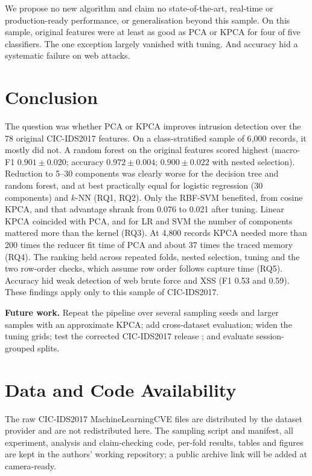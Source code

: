 \documentclass[runningheads]{llncs}
\begin{document}
We propose no new algorithm and claim no state-of-the-art, real-time or production-ready performance, or generalisation beyond this sample. On this sample, original features were at least as good as PCA or KPCA for four of five classifiers. The one exception largely vanished with tuning. And accuracy hid a systematic failure on web attacks.

\section{Conclusion}
The question was whether PCA or KPCA improves intrusion detection over the 78 original CIC-IDS2017 features. On a class-stratified sample of 6{,}000 records, it mostly did not. A random forest on the original features scored highest (macro-F1 $0.901\pm0.020$; accuracy $0.972\pm0.004$; $0.900\pm0.022$ with nested selection). Reduction to 5--30 components was clearly worse for the decision tree and random forest, and at best practically equal for logistic regression (30 components) and $k$-NN (RQ1, RQ2). Only the RBF-SVM benefited, from cosine KPCA, and that advantage shrank from 0.076 to 0.021 after tuning. Linear KPCA coincided with PCA, and for LR and SVM the number of components mattered more than the kernel (RQ3). At 4{,}800 records KPCA needed more than 200 times the reducer fit time of PCA and about 37 times the traced memory (RQ4). The ranking held across repeated folds, nested selection, tuning and the two row-order checks, which assume row order follows capture time (RQ5). Accuracy hid weak detection of web brute force and XSS (F1 0.53 and 0.59). These findings apply only to this sample of CIC-IDS2017.

\textbf{Future work.} Repeat the pipeline over several sampling seeds and larger samples with an approximate KPCA; add cross-dataset evaluation; widen the tuning grids; test the corrected CIC-IDS2017 release \cite{engelen2021}; and evaluate session-grouped splits.


\section*{Data and Code Availability}
The raw CIC-IDS2017 MachineLearningCVE files are distributed by the dataset provider \cite{sharafaldin2018} and are not redistributed here. The sampling script and manifest, all experiment, analysis and claim-checking code, per-fold results, tables and figures are kept in the authors' working repository; a public archive link will be added at camera-ready.
\end{document}
